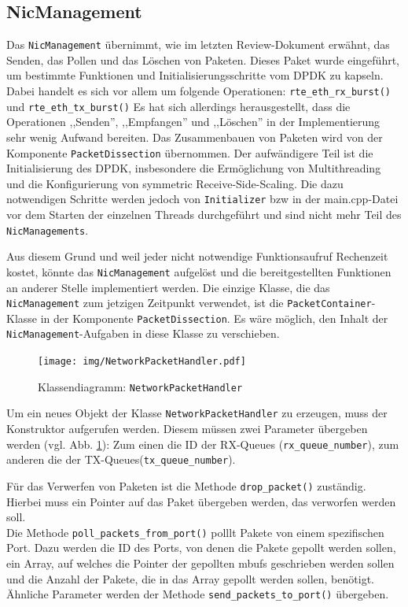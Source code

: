 \documentclass[../review_2.tex]{subfiles}
\begin{document}
\subsection{NicManagement}
Das \texttt{NicManagement} übernimmt, wie im letzten Review-Dokument erwähnt, das Senden, das Pollen und das Löschen von Paketen. Dieses Paket wurde eingeführt, um bestimmte Funktionen und Initialisierungsschritte vom DPDK zu kapseln. Dabei handelt es sich vor allem um folgende Operationen: \texttt{rte\_eth\_rx\_burst()} und \texttt{rte\_eth\_tx\_burst()} Es hat sich allerdings herausgestellt, dass die Operationen ,,Senden'', ,,Empfangen'' und ,,Löschen'' in der Implementierung sehr wenig Aufwand bereiten. Das Zusammenbauen von Paketen wird von der Komponente \texttt{PacketDissection} übernommen. Der aufwändigere Teil ist die Initialisierung des DPDK, insbesondere die Ermöglichung von Multithreading und die Konfigurierung von symmetric Receive-Side-Scaling. Die dazu notwendigen Schritte werden jedoch von \texttt{Initializer} bzw in der main.cpp-Datei vor dem Starten der einzelnen Threads durchgeführt und sind nicht mehr Teil des \texttt{NicManagements}.

Aus diesem Grund und weil jeder nicht notwendige Funktionsaufruf Rechenzeit kostet, könnte das \texttt{NicManagement} aufgelöst und die bereitgestellten Funktionen an anderer Stelle implementiert werden. Die einzige Klasse, die das \texttt{NicManagement} zum jetzigen Zeitpunkt verwendet, ist die \texttt{PacketContainer}-Klasse in der Komponente \texttt{PacketDissection}. Es wäre möglich, den Inhalt der \texttt{NicManagement}-Aufgaben in diese Klasse zu verschieben.

\begin{figure}[h]
    \centering
    \texttt{[image: img/NetworkPacketHandler.pdf]}
    \caption{Klassendiagramm: \texttt{NetworkPacketHandler}}
    \label{nph}
\end{figure}

Um ein neues Objekt der Klasse \texttt{NetworkPacketHandler} zu erzeugen, muss der Konstruktor aufgerufen werden. Diesem müssen zwei Parameter übergeben werden (vgl. Abb. \ref{nph}): Zum einen die ID der RX-Queues (\texttt{rx\_queue\_number}), zum anderen die der TX-Queues(\texttt{tx\_queue\_number}).

Für das Verwerfen von Paketen ist die Methode \texttt{drop\_packet()} zuständig. Hierbei muss ein Pointer auf das Paket übergeben werden, das verworfen werden soll.\\
Die Methode  \texttt{poll\_packets\_from\_port()} polllt Pakete von einem spezifischen Port. Dazu werden die ID des Ports, von denen die Pakete gepollt werden sollen, ein Array, auf welches die Pointer der gepollten mbufs geschrieben werden sollen und die Anzahl der Pakete, die in das Array gepollt werden sollen, benötigt.
Ähnliche Parameter werden der Methode \texttt{send\_packets\_to\_port()} übergeben.
\end{document}
